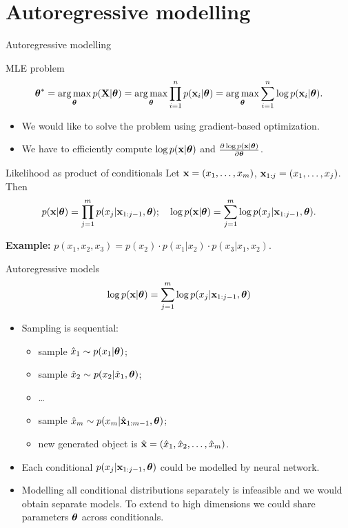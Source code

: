 \section{Autoregressive modelling}
\begin{frame}{Autoregressive modelling}
    \begin{block}{MLE problem}
	    \vspace{-0.7cm}
	    \[
	        \boldsymbol{\theta}^* = \operatorname*{arg\,max}_{\boldsymbol{\theta}} p(\mathbf{X} | \boldsymbol{\theta}) = \operatorname*{arg\,max}_{\boldsymbol{\theta}} \prod_{i=1}^n p(\mathbf{x}_i | \boldsymbol{\theta}) = \operatorname*{arg\,max}_{\boldsymbol{\theta}} \sum_{i=1}^n \log p(\mathbf{x}_i | \boldsymbol{\theta}).
	    \]
	    \vspace{-0.5cm}
    \end{block}
    \begin{itemize}
        \item We would like to solve the problem using gradient-based optimization.
        \item We have to efficiently compute $\log p(\mathbf{x} | \boldsymbol{\theta})$ and $\frac{\partial \log p(\mathbf{x} | \boldsymbol{\theta})}{\partial \boldsymbol{\theta}}$.
    \end{itemize}
    \begin{block}{Likelihood as product of conditionals}
    Let $\mathbf{x} = (x_1, \dots, x_m)$, $\mathbf{x}_{1:j} = (x_1, \dots, x_j)$. Then 
    \[
        p(\mathbf{x} | \boldsymbol{\theta}) = \prod_{j=1}^m p(x_j | \mathbf{x}_{1:j - 1}, \boldsymbol{\theta}); \quad 
        \log p(\mathbf{x} | \boldsymbol{\theta}) = \sum_{j=1}^m \log p(x_j | \mathbf{x}_{1:j - 1}, \boldsymbol{\theta}).
    \]
    \end{block}
	\textbf{Example:} $p(x_1, x_2, x_3) = p(x_2) \cdot p(x_1 | x_2) \cdot p(x_3 | x_1, x_2)$.
\end{frame}
\begin{frame}{Autoregressive models}
    \[
    \log p(\mathbf{x}| \boldsymbol{\theta}) = \sum_{j=1}^m \log p(x_j | \mathbf{x}_{1:j - 1}, \boldsymbol{\theta})
    \]
    \begin{itemize}
	    \item Sampling is sequential:
	    \begin{itemize}
    		\item sample $\hat{x}_1 \sim p(x_1 | \boldsymbol{\theta})$;
    		\item sample $\hat{x}_2 \sim p(x_2 | \hat{x}_1, \boldsymbol{\theta})$;
    		\item \dots
    		\item sample $\hat{x}_m \sim p(x_m | \hat{\mathbf{x}}_{1:m-1}, \boldsymbol{\theta})$;
    		\item new generated object is $\hat{\mathbf{x}} = (\hat{x}_1, \hat{x}_2, \dots, \hat{x}_m)$.
    	\end{itemize}
        \item Each conditional $p(x_j | \mathbf{x}_{1:j - 1}, \boldsymbol{\theta})$ could be modelled by neural network.
        \item Modelling all conditional distributions separately is infeasible and we would obtain separate models. To extend to high dimensions we could share parameters $\boldsymbol{\theta}$ across conditionals.

    \end{itemize}
\end{frame}
